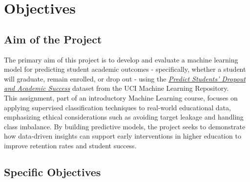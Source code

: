 \documentclass[twoside,final]{hcmut-report}
\begin{document}
\fancyfoot{}
\coverpage\clearpage

\tableofcontents
\listoffigures
\clearpage

\setcounter{page}{1}

\section{Objectives}

\subsection*{Aim of the Project}

The primary aim of this project is to develop and evaluate a machine learning model for predicting student academic outcomes - specifically, whether a student will graduate, remain enrolled, or drop out - using the \href{https://archive.ics.uci.edu/dataset/697/predict+students+dropout+and+academic+success}{\textit{Predict Students' Dropout and Academic Success}} dataset from the UCI Machine Learning Repository.\\

This assignment, part of an introductory Machine Learning course, focuses on applying supervised classification techniques to real-world educational data, emphasizing ethical considerations such as avoiding target leakage and handling class imbalance. By building predictive models, the project seeks to demonstrate how data-driven insights can support early interventions in higher education to improve retention rates and student success.

\subsection*{Specific Objectives}
\end{document}
